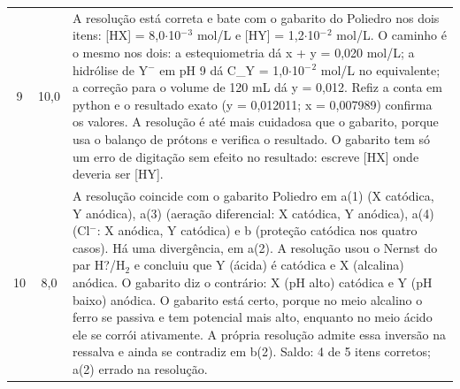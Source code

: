 \documentclass{article}%
\begin{document}
\begin{longtable}{@{}c c p{}@{}}
9 & 10,0 & A resolução está correta e bate com o gabarito do Poliedro nos dois itens: {[}HX{]} = 8,0$\cdot$10$^{-}$$^3$ mol/L e {[}HY{]} = 1,2$\cdot$10$^{-}$$^2$ mol/L. O caminho é o mesmo nos dois: a estequiometria dá x + y = 0,020 mol/L; a hidrólise de Y$^{-}$ em pH 9 dá C\_Y = 1,0$\cdot$10$^{-}$$^2$ mol/L no equivalente; a correção para o volume de 120 mL dá y = 0,012. Refiz a conta em python e o resultado exato (y = 0,012011; x = 0,007989) confirma os valores. A resolução é até mais cuidadosa que o gabarito, porque usa o balanço de prótons e verifica o resultado. O gabarito tem só um erro de digitação sem efeito no resultado: escreve {[}HX{]} onde deveria ser {[}HY{]}. \\
10 & 8,0 & A resolução coincide com o gabarito Poliedro em a(1) (X catódica, Y anódica), a(3) (aeração diferencial: X catódica, Y anódica), a(4) (Cl$^{-}$: X anódica, Y catódica) e b (proteção catódica nos quatro casos). Há uma divergência, em a(2). A resolução usou o Nernst do par H?/H$_{2}$ e concluiu que Y (ácida) é catódica e X (alcalina) anódica. O gabarito diz o contrário: X (pH alto) catódica e Y (pH baixo) anódica. O gabarito está certo, porque no meio alcalino o ferro se passiva e tem potencial mais alto, enquanto no meio ácido ele se corrói ativamente. A própria resolução admite essa inversão na ressalva e ainda se contradiz em b(2). Saldo: 4 de 5 itens corretos; a(2) errado na resolução. \\
\bottomrule\end{longtable}%
\end{document}
